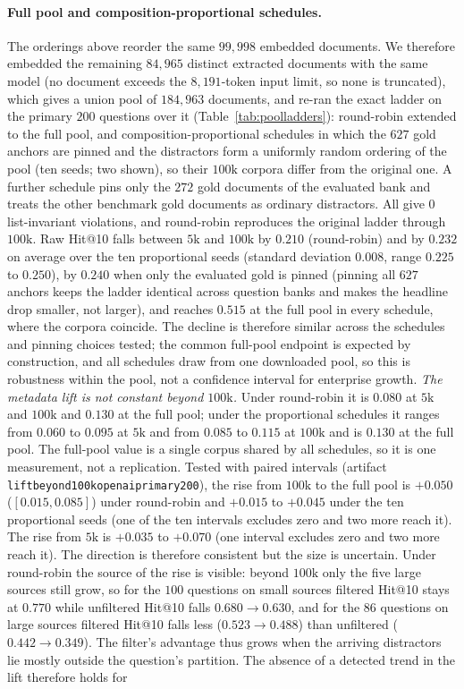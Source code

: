 \documentclass{ieeeaccess}
\makeatletter
\DeclareRobustCommand{\_}{\ifmmode\nfss@text{\textunderscore}\else\textunderscore\allowbreak\fi}
\makeatother
\begin{document}
\paragraph{Full pool and composition-proportional schedules.}
The orderings above reorder the same $99{,}998$ embedded documents. We therefore embedded the remaining $84{,}965$ distinct extracted documents with the same model (no document exceeds the $8{,}191$-token input limit, so none is truncated), which gives a union pool of $184{,}963$ documents, and re-ran the exact ladder on the primary $200$ questions over it (Table~\ref{tab:poolladders}): round-robin extended to the full pool, and composition-proportional schedules in which the $627$ gold anchors are pinned and the distractors form a uniformly random ordering of the pool (ten seeds; two shown), so their $100\text{k}$ corpora differ from the original one. A further schedule pins only the $272$ gold documents of the evaluated bank and treats the other benchmark gold documents as ordinary distractors. All give $0$ list-invariant violations, and round-robin reproduces the original ladder through $100\text{k}$. Raw Hit@10 falls between $5\text{k}$ and $100\text{k}$ by $0.210$ (round-robin) and by $0.232$ on average over the ten proportional seeds (standard deviation $0.008$, range $0.225$ to $0.250$), by $0.240$ when only the evaluated gold is pinned (pinning all $627$ anchors keeps the ladder identical across question banks and makes the headline drop smaller, not larger), and reaches $0.515$ at the full pool in every schedule, where the corpora coincide. The decline is therefore similar across the schedules and pinning choices tested; the common full-pool endpoint is expected by construction, and all schedules draw from one downloaded pool, so this is robustness within the pool, not a confidence interval for enterprise growth. \emph{The metadata lift is not constant beyond $100\text{k}$.} Under round-robin it is $0.080$ at $5\text{k}$ and $100\text{k}$ and $0.130$ at the full pool; under the proportional schedules it ranges from $0.060$ to $0.095$ at $5\text{k}$ and from $0.085$ to $0.115$ at $100\text{k}$ and is $0.130$ at the full pool. The full-pool value is a single corpus shared by all schedules, so it is one measurement, not a replication. Tested with paired intervals (artifact \texttt{lift\_beyond\_100k\_openai\_primary200}), the rise from $100\text{k}$ to the full pool is $+0.050$ ($[0.015,0.085]$) under round-robin and $+0.015$ to $+0.045$ under the ten proportional seeds (one of the ten intervals excludes zero and two more reach it). The rise from $5\text{k}$ is $+0.035$ to $+0.070$ (one interval excludes zero and two more reach it). The direction is therefore consistent but the size is uncertain. Under round-robin the source of the rise is visible: beyond $100\text{k}$ only the five large sources still grow, so for the $100$ questions on small sources filtered Hit@10 stays at $0.770$ while unfiltered Hit@10 falls $0.680{\to}0.630$, and for the $86$ questions on large sources filtered Hit@10 falls less ($0.523{\to}0.488$) than unfiltered ($0.442{\to}0.349$). The filter's advantage thus grows when the arriving distractors lie mostly outside the question's partition. The absence of a detected trend in the lift therefore holds for 
\end{document}
